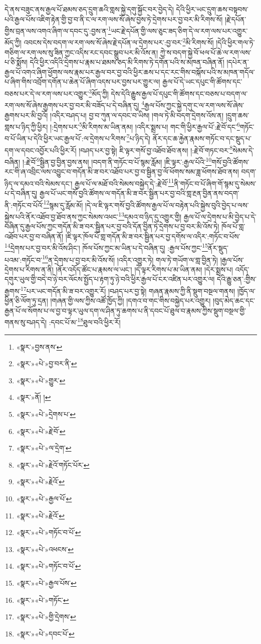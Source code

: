 དེ་ནས་བཟུང་ནས་རྒྱལ་པོ་ཐམས་ཅད་དྲུག་ཆའི་གླས་སྐྱེ་དགུ་སྐྱོང་བར་བྱེད་དེ། དེའི་ཕྱིར་ཡང་དྲུག་ཆས་བསྟབས་པའི་རྒྱལ་པོས་འཇིག་རྟེན་གྱི་བྱ་བ་ནི་ང་ལ་རག་ལས་སོ་ཞེས་བྱས་ཏེ་དྲེགས་པར་བྱ་བར་མི་རིགས་སོ། །རྗེ་དཔོན་གྱིས་བྲན་ལས་འགའ་ཞིག་ལ་དབང་དུ་:བྱས་ན་\footnote{«སྣར་»བྱས་ནས་}ཡང་རྗེ་དཔོན་གྱི་ལས་ཅུང་ཟད་ཅིག་དེ་ལ་རག་ལས་པར་འགྱུར་མོད་ཀྱི། འབངས་དེས་བདག་ལ་རག་ལས་སོ་ཞེས་རྗེ་དཔོན་ལ་དྲེགས་པར་:བྱ་བར་\footnote{«སྣར་»«པེ་»བྱ་བར་ནི་}མི་རིགས་སོ། །དེའི་ཕྱིར་གལ་ཏེ་གཅིག་ལ་རག་ལས་སུ་ཟིན་ཀྱང་འདིས་རང་དབང་སྒྲུབ་པར་མི་འོས་ན། ཀྱེ་ས་བདག་སྐྱེ་བོ་ཕལ་པོ་ཆེ་ལ་རག་ལས་པ་ཅི་སྨོས། དེའི་ཕྱིར་འདིའི་དྲེགས་པ་རྣམ་པ་ཐམས་ཅད་མི་རིགས་ཏེ་དགོན་པའི་ས་མཁན་བཞིན་ནོ། །དཔེར་ན་རྒྱལ་པོ་འགའ་ཞིག་ཕྱོགས་ལས་རྣམ་པར་རྒྱལ་བར་བྱ་བའི་ཕྱིར་ཆས་པ་དང་རང་གིས་བསྐོས་པའི་ས་མཁན་གདོལ་པ་ཞིག་གིས་འབྲོག་དགོན་པ་ཆེན་པོ་ཞིག་འདས་པར་བྱས་པར་གྱུར་ལ། རྒྱལ་པོ་དེ་ཡང་དཔུང་གི་ཚོགས་དང་བཅས་པར་དེ་ལ་རག་ལས་པར་འགྱུར་\footnote{«སྣར་»«པེ་»གྱུར་}མོད་ཀྱི། དེས་དེའི་རྒྱུས་རྒྱལ་པོ་དཔུང་གི་ཚོགས་དང་བཅས་པ་བདག་ལ་རག་ལས་སོ་ཞེས་རྒྱགས་པར་བྱ་བར་མི་བཟོད་པ་དེ་བཞིན་དུ། \footnote{«སྣར་»ནོ། ། }རྒྱལ་པོས་ཀྱང་སྐྱེ་དགུ་ང་ལ་རག་ལས་སོ་ཞེས་རྒྱགས་པར་མི་བྱའོ། །འདིར་བཤད་པ། བྱ་བ་ཀུན་ལ་དབང་བ་ཡིས། །གལ་ཏེ་མི་བདག་དྲེགས་འོས་ན། །དྲུག་ཆས་གླས་པ་ཉིད་ཀྱི་ཕྱིར། །:དྲེགས་པར་\footnote{«སྣར་»«པེ་»དྲེགས་པ་}མི་རིགས་མ་ཡིན་ནམ། །འདིར་སྨྲས་པ། གང་གི་ཕྱིར་རྒྱལ་པོ་:རྗེ་བོ་དང་\footnote{«སྣར་»«པེ་»རྗེ་བོ་}གཏོང་བ་པོ་ཡིན་པ་དེའི་ཕྱིར་ཡང་རྒྱལ་པོ་:ལ་དྲེགས་པ་རིགས་\footnote{«སྣར་»«པེ་»ལ་དྲེག་}པ་ཉིད་དེ། ནོར་དང་ཆ་རྐྱེན་རྣམས་གཏོང་བ་དང་སྡུད་པ་དག་ལ་དབང་འབྱོར་པའི་ཕྱིར་རོ། །བཤད་པར་བྱ་སྟེ། ཇི་ལྟར་གསོ་བྱ་འཐོབ་ཐོབ་ནས། །:རྗེ་བོ་གཏང་བར་\footnote{«སྣར་»«པེ་»རྗེའོ་གཏོང་པོར་}སེམས་དེ་བཞིན། །:རྗེ་བོ་\footnote{«སྣར་»«པེ་»རྗེའོ་}སྦྱིན་བྱ་བྱིན་བྱས་ནས། །བདག་ནི་གཏོང་བ་པོ་སྙམ་རློམ། །ཇི་ལྟར་:རྒྱལ་པོའི་\footnote{«སྣར་»«པེ་»རྒྱལ་པོ་}གསོ་བྱའི་ཚོགས་རང་གི་ཞ་འབྲིང་ལས་འབྱུང་བ་གདོན་མི་ཟ་བར་འཐོབ་པར་བྱ་བ་སྦྱིན་བྱ་ལོ་ཕོགས་སམ་ཟླ་ཕོགས་ཐོབ་ནས། བདག་ཉིད་ལ་དམའ་བའི་སེམས་དང་། རྒྱལ་པོ་ལ་མཐོ་བའི་སེམས་བསྐྱེད་དེ་:རྗེ་བོ་\footnote{«སྣར་»«པེ་»རྗེའོ་}ནི་གཏོང་བ་པོ་ཞིག་གོ་སྙམ་དུ་སེམས་པ་དེ་བཞིན་དུ། རྒྱལ་པོ་ཡང་གསོ་བྱའི་ཚོགས་ལ་གདོན་མི་ཟ་བར་སྦྱིན་པར་བྱ་བའི་གླ་རྔན་བྱིན་ནས་བདག་ནི་:གཏོང་བ་པོའོ་\footnote{«སྣར་»«པེ་»གཏོང་བ་པོ་}སྙམ་དུ་རློམ་མོ། །དེ་ལ་ཇི་ལྟར་གསོ་བྱའི་ཚོགས་རྒྱལ་པོ་ལ་བརྟེན་པའི་སྐྱེས་བུའི་བྱེད་པ་ལས་སྐྱེས་པའི་ནོར་འཐོབ་བྱ་ཐོབ་ནས་ཀྱང་སེམས་འཕང་\footnote{«སྣར་»«པེ་»འཕངས་}དམའ་བ་ཉིད་དུ་འགྱུར་གྱི། རྒྱལ་པོ་ལ་དྲེགས་པ་མི་བྱེད་པ་དེ་བཞིན་དུ་རྒྱལ་པོས་ཀྱང་གདོན་མི་ཟ་བར་སྦྱིན་པར་བྱ་བའི་དོན་བྱིན་ཏེ་དྲེགས་པ་བྱ་བར་མི་འོས་ཏེ། ཁོལ་པོ་གླ་འཐོབ་པར་བྱ་བ་བཞིན་ནོ། །ཇི་ལྟར་ཁོལ་པོ་གླ་གདོན་མི་ཟ་བར་སྦྱིན་པར་བྱ་དགོས་ལ་འདིར་:གཏོང་བ་པོས་\footnote{«སྣར་»«པེ་»གཏོང་བ་པོ་}དྲེགས་པར་བྱ་བར་མི་འོས་ཤིང་། ཁོལ་པོས་ཀྱང་མ་ཡིན་པ་དེ་བཞིན་དུ། :རྒྱལ་པོས་ཀྱང་\footnote{«སྣར་»«པེ་»རྒྱལ་པོས་}ནོར་སྡུད་པའམ་:གཏོང་བ་\footnote{«སྣར་»«པེ་»གཏོང་}ན་དྲེགས་པ་བྱ་བར་མི་འོས་སོ། །འདིར་འགྱུར་ཏེ། གལ་ཏེ་གཡོག་ལ་གླ་བྱིན་ཏེ། །རྒྱལ་པོས་དྲེགས་པ་རིགས་ན་ནི། །ནོར་འདོད་ཚོང་པ་རྣམས་ལ་ཡང་། །དེ་ལྟར་རིགས་པ་མ་ཡིན་ནམ། །དེར་སྨྲས་པ། འདོད་དགུར་ཡུལ་གྱི་བདེ་བ་ཉེ་བར་ལོངས་སྤྱོད་པ་རྟག་ཏུ་ཉེ་བའི་ཕྱིར་རྒྱལ་པོ་ངར་འཛིན་པར་འགྱུར་ལ། དེའི་རྒྱུ་ཅན་:གྱིས་རྒྱགས་\footnote{«སྣར་»«པེ་»གྱི་དྲེགས་}པར་ཡང་གདོན་མི་ཟ་བར་འགྱུར་རོ། །བཤད་པར་བྱ་སྟེ། གཞན་རྣམས་ཀྱི་ནི་སྡུག་བསྔལ་གནས། །ཁྱོད་ལ་ཕྱིན་ཅི་ལོག་ཏུ་དྲན། །གཞན་གྱི་ལས་ཀྱིས་འཚོ་ཁྱོད་ཀྱི། །དགའ་བ་གང་གིས་བསྐྱེད་པར་འགྱུར། །བུད་མེད་ཆང་དང་རྒྱན་པོ་ལ་སོགས་པ་ལ་བྱ་བ་ལྟར་ཡུལ་དག་ལ་ཤིན་ཏུ་ཆགས་པ་ནི་དབང་པོ་ཐུལ་བ་རྣམས་ཀྱིས་སྡུག་བསྔལ་གྱི་གནས་སུ་བཤད་དེ། :དབང་པོ་མ་\footnote{«སྣར་»«པེ་»དབང་པོ་}ཐུལ་བའི་ཕྱིར་རོ། 
